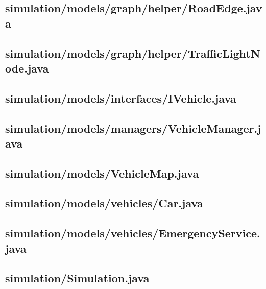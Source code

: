 \subsection{simulation/models/graph/helper/RoadEdge.java}

\newpage
\subsection{simulation/models/graph/helper/TrafficLightNode.java}

\newpage
\subsection{simulation/models/interfaces/IVehicle.java}

\newpage
\subsection{simulation/models/managers/VehicleManager.java}

\newpage
\subsection{simulation/models/VehicleMap.java}

\newpage
\subsection{simulation/models/vehicles/Car.java}

\newpage
\subsection{simulation/models/vehicles/EmergencyService.java}

\newpage
\subsection{simulation/Simulation.java}

\newpage
